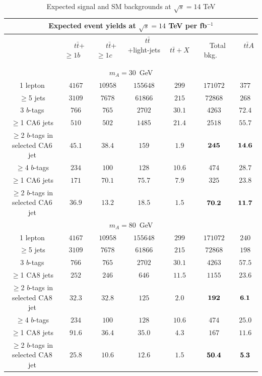 \documentclass[preprintnumbers,superscriptaddress,nofootinbib,aps,prd,floatfix]{revtex4}
\newcommand{\ttbar}{\ensuremath{t\bar{t}}}
\begin{document}
\begin{table}[h] 
\begin{center} 
\begin{tabular}{ccccc|cc} 
\hline\hline
\multicolumn{7}{c}{Expected event yields at $\sqrt{s}=14$ TeV per fb$^{-1}$} \\
\hline
&$\quad$$\ttbar$+$\geq$$1b$$\quad$ &$\quad$$\ttbar$+$\geq$$1c$$\quad$&$\quad$$\ttbar$+light-jets$\quad$&$\quad$$\ttbar+X$$\quad$ & $\quad$Total bkg.$\quad$ & $\quad$$\ttbar A$$\quad$ \\ 
\hline\hline
\multicolumn{7}{c}{$m_A=30$~GeV} \\
\hline
1 lepton&$4167$&$10958$&$155648$&$299$&$171072$&$377$ \\ 
$\geq$5 jets&$3109$&$7678$&$61866$&$215$&$72868$&$268$ \\ 
\hline
3 $b$-tags&$766$&$765$&$2702$&$30.1$&$4263$&$72.4$ \\ 
$\geq$1 CA6 jets &$510$&$502$&$1485$&$21.4$&$2518$&$55.7$ \\ 
$\geq$2 $b$-tags in selected CA6 jet & $45.1$&$38.4$&$159$&$1.9$&$\bf 245$&$\bf 14.6$ \\ 
\hline
$\geq$4 $b$-tags&$234$&$100$&$128$&$10.6$&$474$&$28.7$ \\ 
$\geq$1 CA6 jets&$171$&$70.1$&$75.7$&$7.9$&$325$&$23.8$ \\ 
$\geq$2 $b$-tags in selected CA6 jet &$36.9$&$13.2$&$18.5$&$1.5$&$\bf 70.2$&$\bf 11.7$ \\ 
\hline\hline
\multicolumn{7}{c}{$m_A=80$~GeV} \\
\hline
1 lepton&$4167$&$10958$&$155648$&$299$&$171072$&$240$ \\ 
$\geq$5 jets&$3109$&$7678$&$61866$&$215$&$72868$&$198$ \\ 
\hline
3 $b$-tags&$766$&$765$&$2702$&$30.1$&$4263$&$57.5$ \\ 
$\geq$1 CA8 jets &$252$&$246$&$646$&$11.5$&$1155$&$23.6$ \\ 
$\geq$2 $b$-tags in selected CA8 jet &$32.3$&$32.8$&$125$&$2.0$&$\bf 192$&$\bf 6.1$ \\ 
\hline
$\geq$4 $b$-tags&$234$&$100$&$128$&$10.6$&$474$&$25.0$ \\ 
$\geq$1 CA8 jets&$91.6$&$36.4$&$35.0$&$4.3$&$167$&$11.6$ \\ 
$\geq$2 $b$-tags in selected CA8 jet &$25.8$&$10.6$&$12.6$&$1.5$&$\bf 50.4$&$\bf 5.3$ \\ 
\hline\hline
\end{tabular} 
\caption{\small {Expected signal and SM backgrounds at $\sqrt{s}=14$ TeV
}}
\end{center}
\end{table}
\end{document}
